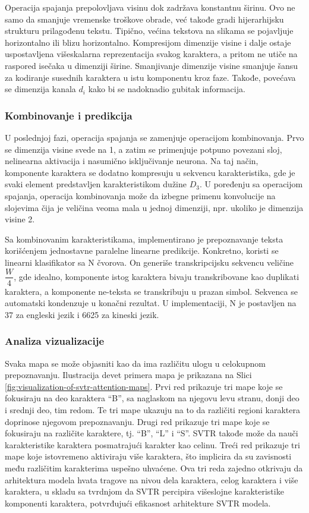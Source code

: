 \documentclass[a4paper,12pt]{article}
\begin{document}
	Operacija spajanja prepolovljava visinu dok zadržava konstantnu širinu. Ovo ne samo da smanjuje vremenske troškove obrade, već takođe gradi hijerarhijsku strukturu prilagođenu tekstu. Tipično, većina tekstova na slikama se pojavljuje horizontalno ili blizu horizontalno. Kompresijom dimenzije visine i dalje ostaje uspostavljena višeskalarna reprezentacija svakog karaktera, a pritom ne utiče na raspored isečaka u dimenziji širine. Smanjivanje dimenzije visine smanjuje šansu za kodiranje susednih karaktera u istu komponentu kroz faze. Takođe, povećava se dimenzija kanala \(d_i\) kako bi se nadoknadio gubitak informacija.
	
	\subsubsection{Kombinovanje i predikcija}
	U poslednjoj fazi, operacija spajanja se zamenjuje operacijom kombinovanja. Prvo se dimenzija visine svede na 1, a zatim se primenjuje potpuno povezani sloj, nelinearna aktivacija i nasumično isključivanje neurona. Na taj način, komponente karaktera se dodatno kompresuju u sekvencu karakteristika, gde je svaki element predstavljen karakteristikom dužine \(D_3\). U poređenju sa operacijom spajanja, operacija kombinovanja može da izbegne primenu konvolucije na slojevima čija je veličina veoma mala u jednoj dimenziji, npr. ukoliko je dimenzija visine 2.
	
	Sa kombinovanim karakteristikama, implementirano je prepoznavanje teksta korišćenjem jednostavne paralelne linearne predikcije. Konkretno, koristi se linearni klasifikator sa N čvorova. On generiše transkripcijsku sekvencu veličine \(\dfrac{W}{4}\), gde idealno, komponente istog karaktera bivaju transkribovane kao duplikati karaktera, a komponente ne-teksta se transkribuju u prazan simbol. Sekvenca se automatski kondenzuje u konačni rezultat. U implementaciji, N je postavljen na 37 za engleski jezik i 6625 za kineski jezik.
	
	\subsubsection{Analiza vizualizacije}
	
	Svaka mapa se može objasniti kao da ima različitu ulogu u celokupnom prepoznavanju. Ilustracija devet primera mapa je prikazana na Slici \ref{fig:visualization-of-svtr-attention-maps}. Prvi red prikazuje tri mape koje se fokusiraju na deo karaktera \enquote{B}, sa naglaskom na njegovu levu stranu, donji deo i srednji deo, tim redom. Te tri mape ukazuju na to da različiti regioni karaktera doprinose njegovom prepoznavanju. Drugi red prikazuje tri mape koje se fokusiraju na različite karaktere, tj. \enquote{B}, \enquote{L} i \enquote{S}. SVTR takođe može da nauči karakteristike karaktera posmatrajući karakter kao celinu. Treći red prikazuje tri mape koje istovremeno aktiviraju više karaktera, što implicira da su zavisnosti među različitim karakterima uspešno uhvaćene. Ova tri reda zajedno otkrivaju da arhitektura modela hvata tragove na nivou dela karaktera, celog karaktera i više karaktera, u skladu sa tvrdnjom da SVTR percipira višeslojne karakteristike komponenti karaktera, potvrđujući efikasnost arhitekture SVTR modela.
	
\end{document}
